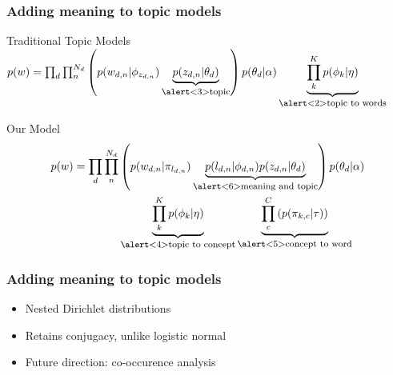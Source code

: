 \documentclass[compress]{beamer}
\newcommand{\explain}[2]{\underbrace{#2}_{\mbox{\footnotesize{#1}}}}
\newif\ifjobtalk\jobtalktrue
\begin{document}
\ifjobtalk

\begin{frame}
  \frametitle{Adding meaning to topic models}
        \begin{block}{Traditional Topic Models}
                $ p(w) = \prod_d \prod_n^{N_d} \left( p(w_{d,n} | \phi_{z_{d,n}})
                  \explain{\alert<3>{topic}}{p(z_{d,n} | \theta_d)} \right) p(\theta_d | \alpha)                 \explain{\alert<2>{topic to words}}{ \prod_k^K
p(\phi_k | \eta) }$
        \end{block}

        \begin{block}{Our Model}
          \vspace{-0.8cm}
          \begin{align*}
               p(w) = \prod_d \prod_n^{N_d} & \left( p(w_{d,n} | \pi_{l_{d,n}})
                 \explain{\alert<6>{meaning and topic}} {p(l_{d,n} | \phi_{d,n} )
                   p(z_{d,n} | \theta_d)}  \right) p(\theta_d | \alpha) \\
               &  \explain{\alert<4>{topic to concept}}{\prod_k^K
                p(\phi_k | \eta)} \explain{\alert<5>{concept to word}}{\prod_c^C \left(
                  p(\pi_{k,c} | \tau) \right) }
           \end{align*}
        \end{block}


\end{frame}

\begin{frame}
  \frametitle{Adding meaning to topic models}
  \begin{itemize}
    \item Nested Dirichlet
      distributions~\cite{boyd-graber-07,andrzejewski-09}
    \item Retains conjugacy, unlike logistic normal
    \item Future direction: co-occurence analysis
    \end{itemize}
\end{frame}
\fi





\end{document}
